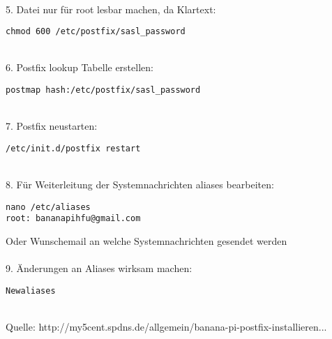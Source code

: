 ~\\
5. Datei nur für root lesbar machen, da Klartext:
\begin{lstlisting}
chmod 600 /etc/postfix/sasl_password 
\end{lstlisting}
~\\
6. Postfix lookup Tabelle erstellen:
\begin{lstlisting}
postmap hash:/etc/postfix/sasl_password
\end{lstlisting}
~\\
7. Postfix neustarten:
\begin{lstlisting}
/etc/init.d/postfix restart
\end{lstlisting}
~\\
8. Für Weiterleitung der Systemnachrichten aliases bearbeiten:
\begin{lstlisting}
nano /etc/aliases 
root: bananapihfu@gmail.com
\end{lstlisting}
Oder Wunschemail an welche Systemnachrichten gesendet werden\\
~\\
9. Änderungen an Aliases wirksam machen:
\begin{lstlisting}
Newaliases
\end{lstlisting}
~\\Quelle: http://my5cent.spdns.de/allgemein/banana-pi-postfix-installieren... \cite{postfix}



